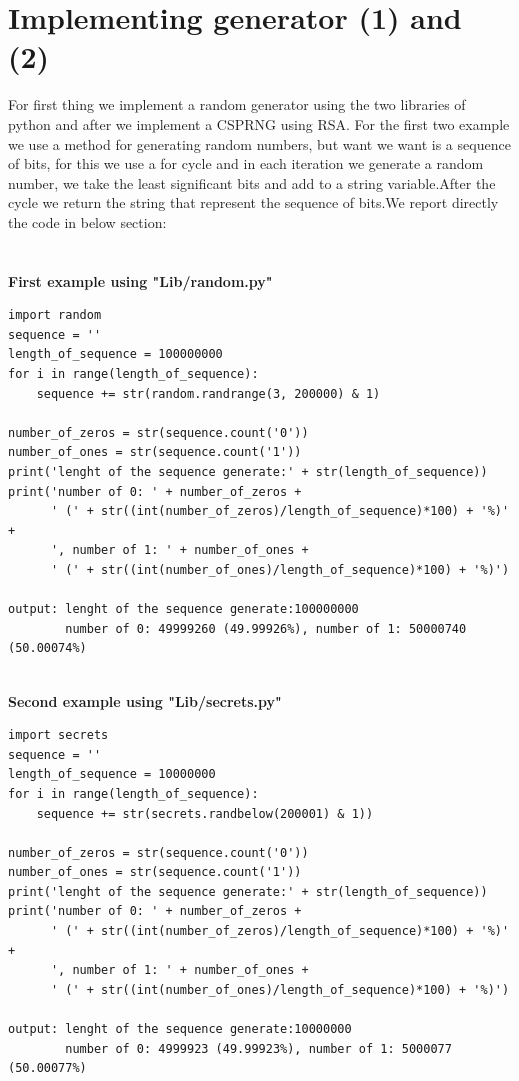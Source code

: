 \documentclass{article}
\begin{document}
\section{Implementing generator (1) and (2)}
For first thing we implement a random generator using the two libraries of python and after we implement a CSPRNG using RSA. For the first two example we use a method for generating random numbers, but want we want is a sequence of bits, for this we use a for cycle and in each iteration we generate a random number, we take the least significant bits and add to a string variable.After the cycle we return the string that represent the sequence of bits.We report directly the code in below section:\\\\ \textbf{\\First example using "Lib/random.py"}
\begin{lstlisting}
import random
sequence = ''
length_of_sequence = 100000000
for i in range(length_of_sequence):
    sequence += str(random.randrange(3, 200000) & 1)

number_of_zeros = str(sequence.count('0'))
number_of_ones = str(sequence.count('1'))
print('lenght of the sequence generate:' + str(length_of_sequence))
print('number of 0: ' + number_of_zeros + 
      ' (' + str((int(number_of_zeros)/length_of_sequence)*100) + '%)' +
      ', number of 1: ' + number_of_ones + 
      ' (' + str((int(number_of_ones)/length_of_sequence)*100) + '%)')
      
output: lenght of the sequence generate:100000000
        number of 0: 49999260 (49.99926%), number of 1: 50000740 (50.00074%)
\end{lstlisting}
\textbf{\\Second example using "Lib/secrets.py"}
\begin{lstlisting}
import secrets
sequence = ''
length_of_sequence = 10000000
for i in range(length_of_sequence):
    sequence += str(secrets.randbelow(200001) & 1))

number_of_zeros = str(sequence.count('0'))
number_of_ones = str(sequence.count('1'))
print('lenght of the sequence generate:' + str(length_of_sequence))
print('number of 0: ' + number_of_zeros + 
      ' (' + str((int(number_of_zeros)/length_of_sequence)*100) + '%)' +
      ', number of 1: ' + number_of_ones + 
      ' (' + str((int(number_of_ones)/length_of_sequence)*100) + '%)')
      
output: lenght of the sequence generate:10000000
        number of 0: 4999923 (49.99923%), number of 1: 5000077 (50.00077%)
\end{lstlisting}
\end{document}
